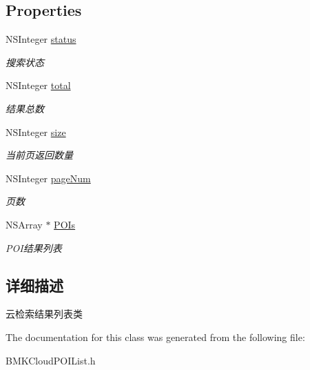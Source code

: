 \subsection*{Properties}
\begin{DoxyCompactItemize}
\item 
\hypertarget{interface_b_m_k_cloud_p_o_i_list_a9a0761aa32216b6d96a3f3d538d8f2db}{N\-S\-Integer \hyperlink{interface_b_m_k_cloud_p_o_i_list_a9a0761aa32216b6d96a3f3d538d8f2db}{status}}\label{interface_b_m_k_cloud_p_o_i_list_a9a0761aa32216b6d96a3f3d538d8f2db}

\begin{DoxyCompactList}\small\item\em 搜索状态 \end{DoxyCompactList}\item 
\hypertarget{interface_b_m_k_cloud_p_o_i_list_a71aa046e96ad04026feb159383d3f615}{N\-S\-Integer \hyperlink{interface_b_m_k_cloud_p_o_i_list_a71aa046e96ad04026feb159383d3f615}{total}}\label{interface_b_m_k_cloud_p_o_i_list_a71aa046e96ad04026feb159383d3f615}

\begin{DoxyCompactList}\small\item\em 结果总数 \end{DoxyCompactList}\item 
\hypertarget{interface_b_m_k_cloud_p_o_i_list_a2d38d103dd34862c538ed99a635aafb5}{N\-S\-Integer \hyperlink{interface_b_m_k_cloud_p_o_i_list_a2d38d103dd34862c538ed99a635aafb5}{size}}\label{interface_b_m_k_cloud_p_o_i_list_a2d38d103dd34862c538ed99a635aafb5}

\begin{DoxyCompactList}\small\item\em 当前页返回数量 \end{DoxyCompactList}\item 
\hypertarget{interface_b_m_k_cloud_p_o_i_list_a1301275f0561c350c223dcf838502df8}{N\-S\-Integer \hyperlink{interface_b_m_k_cloud_p_o_i_list_a1301275f0561c350c223dcf838502df8}{page\-Num}}\label{interface_b_m_k_cloud_p_o_i_list_a1301275f0561c350c223dcf838502df8}

\begin{DoxyCompactList}\small\item\em 页数 \end{DoxyCompactList}\item 
\hypertarget{interface_b_m_k_cloud_p_o_i_list_a682ea5efc9695565e9ceacc9553d436d}{N\-S\-Array $\ast$ \hyperlink{interface_b_m_k_cloud_p_o_i_list_a682ea5efc9695565e9ceacc9553d436d}{P\-O\-Is}}\label{interface_b_m_k_cloud_p_o_i_list_a682ea5efc9695565e9ceacc9553d436d}

\begin{DoxyCompactList}\small\item\em P\-O\-I结果列表 \end{DoxyCompactList}\end{DoxyCompactItemize}


\subsection{详细描述}
云检索结果列表类 

The documentation for this class was generated from the following file\-:\begin{DoxyCompactItemize}
\item 
B\-M\-K\-Cloud\-P\-O\-I\-List.\-h\end{DoxyCompactItemize}
